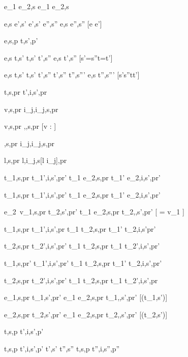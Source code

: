   { }
  {e_1 \Xor e_2,s \symstride e_1 \Xor e_2,s}

    {e,s \symeval e',s'  \Quad
     e',s' \symstride e'',s''}
    {e,s \symstride e'',s''}
    [e \neq e']



  {e,s,p \symnormalise t,s',p'}


    {e,s \symeval t,s'  \Quad
     t,s' \symstride t',s''}
    {e,s \symnormalise t',s''}
    [s'=s''\wedge t=t']

    {e,s \symeval t,s'  \Quad
     t,s' \symstride t',s''  \Quad
     t',s'' \symnormalise t'',s'''}
    {e,s \symnormalise t'',s'''}
    [s'\neq s''\vee t\neq t']





  {t,s,pr \symhandle t',i,s',pr}

  { }
  {\Edit v,s,pr \symhandle \Edit i_j,i_j,s,pr}

  { }
  {\Edit v,s,pr \symhandle \Enter \tau,\Empty,s,pr}
  [v : \tau]

  { }
  {\Enter \tau,s,pr \symhandle \Edit i_j,i_j,s,pr}

  { }
  {\Update l,s,pr \symhandle \Update l,i_j,s[l \mapsto i_j],pr}


  {t_1,s,pr \symhandle t_1',i,s',pr'}
  {t_1 \Then e_2,s,pr \symhandle t_1' \Then e_2,i,s',pr'}

  {t_1,s,pr \symhandle t_1',i,s',pr'}
  {t_1 \Next e_2,s,pr \symhandle t_1' \Next e_2,i,s',pr'}

  {e_2\ v_1,s,pr \symnormalise t_2,s',pr'}
  {t_1 \Next e_2,s,pr \symhandle t_2,\Continue,s',pr'}
  [ = v_1 \wedge \neg{}]


  {t_1,s,pr \symhandle t_1',i,s',pr }
  {t_1 \And t_2,s,pr \symhandle t_1' \And t_2,\First i,s'pr'}

  {t_2,s,pr \symhandle t_2',i,s',pr'}
  {t_1 \And t_2,s,pr \symhandle t_1 \And t_2',\Second i,s',pr'}


  {t_1,s,pr' \symhandle t_1',i,s',pr'}
  {t_1 \Or t_2,s,pr \symhandle t_1' \Or t_2,\First i,s',pr'}

  {t_2,s,pr \symhandle t_2',i,s',pr' }
  {t_1 \Or t_2,s,pr \symhandle t_1 \Or t_2',\Second i,s',pr}


  {e_1,s,pr \symnormalise t_1,s',pr'}
  {e_1 \Xor e_2,s,pr \symhandle t_1,\Left,s',pr'}
  [\neg\Failing(t_1,s')]

  {e_2,s,pr \symnormalise t_2,s',pr'}
  {e_1 \Xor e_2,s,pr \symhandle t_2,\Right,s',pr'}
  [\neg\Failing(t_2,s')]



  {t,s,p \symdrive  t',i,s',p'}


  {t,s,p \symhandle t',i,s',p'  \Quad
   t',s' \symnormalise t'',s''}
  {t,s,p \symdrive t'',i,s'',p''}
